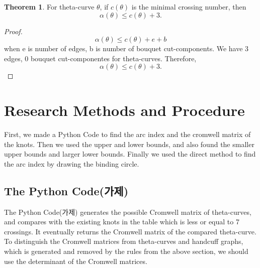\documentclass{article}
\theoremstyle{definition}
\theoremstyle{theorem}
\newtheorem{theorem}{Theorem}
\theoremstyle{proposition}
\theoremstyle{corollary}
\begin{document}
\begin{theorem}
For theta-curve $\theta$, if $c(\theta)$ is the minimal crossing number, then $$\alpha(\theta) \leq c(\theta) + 3.$$
\end{theorem}

\begin{proof}
$$\alpha(\theta) \leq c(\theta) + e + b$$ when e is number of edges, b is number of bouquet cut-components. We have 3 edges, 0 bouquet cut-componentes for theta-curves. Therefore, $$\alpha(\theta) \leq c(\theta) + 3.$$
\end{proof}

\section{Research Methods and Procedure}
First, we made a Python Code to find the arc index and the cromwell matrix of the knots. Then we used the upper and lower bounds, and also found the smaller upper bounds and larger lower bounds. Finally we used the direct method to find the arc index by drawing the binding circle.

\subsection{The Python Code(가제)}
The Python Code(가제) generates the possible Cromwell matrix of theta-curves, and compares with the existing knots in the table which is less or equal to 7 crossings.
It eventually returns the Cromwell matrix of the compared theta-curve.
To distinguish the Cromwell matrices from theta-curves and handcuff graphs, which is generated and removed by the rules from the above section, we should use the determinant of the Cromwell matrices.\\
\end{document}
